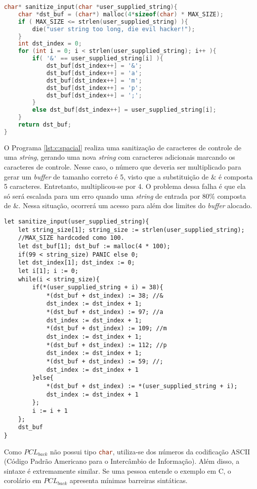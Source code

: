 \begin{lstlisting}[language=C, label={lst:c:spacial}, caption={Exemplo de \emph{Incorret-Calculation-of-Buffer-Size} em C.}]
char* sanitize_input(char *user_supplied_string){
	char *dst_buf = (char*) malloc(4*sizeof(char) * MAX_SIZE);  
	if ( MAX_SIZE <= strlen(user_supplied_string) ){
		die("user string too long, die evil hacker!");
	}  
	int dst_index = 0;  
	for (int i = 0; i < strlen(user_supplied_string); i++ ){
		if( '&' == user_supplied_string[i] ){
			dst_buf[dst_index++] = '&';  
			dst_buf[dst_index++] = 'a';  
			dst_buf[dst_index++] = 'm';  
			dst_buf[dst_index++] = 'p';  
			dst_buf[dst_index++] = ';';
		}
		else dst_buf[dst_index++] = user_supplied_string[i];
	}  
	return dst_buf;
}
\end{lstlisting}

O Programa \ref{lst:c:spacial} realiza uma sanitização de caracteres de controle de uma \emph{string}, gerando uma nova \emph{string} com caracteres adicionais marcando os caracteres de controle. Nesse caso, o número que deveria ser multiplicado para gerar um \emph{buffer} de tamanho correto é 5, visto que a substituição de $\&$ é composta 5 caracteres. Entretanto, multiplicou-se por 4. O problema dessa falha é que ela só será escalada para um erro quando uma \emph{string} de entrada por $80\%$ composta de $\&$. Nessa situação, ocorrerá um acesso para além dos limites do \emph{buffer} alocado.

\begin{lstlisting}[language=PCLback, caption={Exemplo de \emph{Incorret-Calculation-of-Buffer-Size} em $PCL_{back}$}, label={lst:pclback:spacial}]
let sanitize_input(user_supplied_string){
	let string_size[1]; string_size := strlen(user_supplied_string);
	//MAX_SIZE hardcoded como 100.
	let dst_buf[1]; dst_buf := malloc(4 * 100); 
	if(99 < string_size) PANIC else 0;
	let dst_index[1]; dst_index := 0;
	let i[1]; i := 0;
	while(i < string_size){
		if(*(user_supplied_string + i) = 38){
			*(dst_buf + dst_index) := 38; //&
			dst_index := dst_index + 1;
			*(dst_buf + dst_index) := 97; //a
			dst_index := dst_index + 1;
			*(dst_buf + dst_index) := 109; //m
			dst_index := dst_index + 1;
			*(dst_buf + dst_index) := 112; //p
			dst_index := dst_index + 1;
			*(dst_buf + dst_index) := 59; //;
			dst_index := dst_index + 1
		}else{
			*(dst_buf + dst_index) := *(user_supplied_string + i);
			dst_index := dst_index + 1
		};
		i := i + 1
	};
	dst_buf
}
\end{lstlisting}

Como $PCL_{back}$ não possui tipo \lstinline[language=C]|char|, utiliza-se dos números da codificação ASCII (Código Padrão Americano para o Intercâmbio de Informação). Além disso, a sintaxe é extremamente similar. Se uma pessoa entende o exemplo em C, o corolário em $PCL_{back}$ apresenta mínimas barreiras sintáticas.

